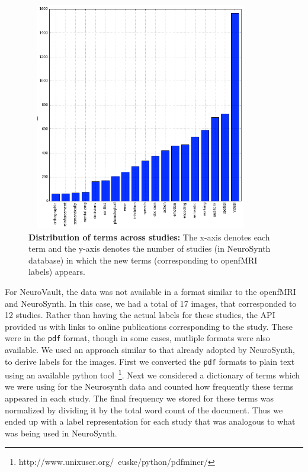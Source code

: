 \documentclass{article} %
\begin{document}
\begin{figure}[h]
\begin{center}
\includegraphics[height=10cm, width=10cm]{histo_new.png}
\end{center}
\caption{\textbf{Distribution of terms across studies:} The x-axis denotes each term and the y-axis denotes the number of studies (in NeuroSynth database) in which the new terms (corresponding to openfMRI labels) appears.}
\label{fig:histo_new}
\end{figure}

For NeuroVault, the data was not available in a format similar to the openfMRI and NeuroSynth. In this case, we had a total of 17 images, that corresponded to 12 studies. Rather than having the actual labels for these studies, the API provided us with links to online publications corresponding to the study. These were in the \texttt{pdf} format, though in some cases, mutliple formats were also available. We used an approach similar to that already adopted by NeuroSynth, to derive labels for the images. First we converted the \texttt{pdf} formats to plain text using an available python tool~\footnote{http://www.unixuser.org/~euske/python/pdfminer/}. Next we considered a dictionary of terms which we were using for the Neurosynth data and counted how frequently these terms appeared in each study. The final frequency we stored for these terms was normalized by dividing it by the total word count of the document. Thus we ended up with a label representation for each study that was analogous to what was being used in NeuroSynth.
\end{document}
